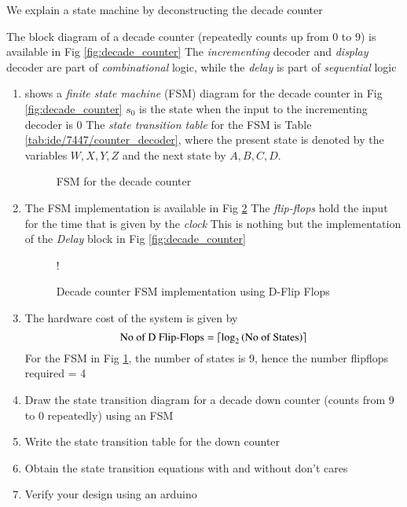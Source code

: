 We explain  a state machine by deconstructing the decade counter

The block diagram of a decade counter (repeatedly counts up from 0 to 9)
is available in Fig \ref{fig:decade_counter}  The {\em incrementing } decoder
and {\em display} decoder are part of {\em combinational} logic, while
the {\em delay} is part of {\em sequential} logic
%
%
\begin{enumerate}[label=\arabic*.,ref=\theenumi]
%
\item {} shows a {\em finite state machine} (FSM) diagram for the decade counter in Fig \ref{fig:decade_counter}  $s_0$ is the state when the input to the incrementing decoder is 0  The {\em state transition table} for the FSM is Table \ref{tab:ide/7447/counter_decoder},
		where the present state is denoted by the variables $W,X,Y,Z$ and the next state by $A,B,C,D$.  
\begin{figure}[!h]
\centering

\caption{FSM for the decade counter}
\label{fig:fsm_counter}
\end{figure}
\item The FSM implementation is available in Fig \ref{fig:dff}  The {\em flip-flops} hold the input for the time that is given by the {\em clock}  This is nothing but the implementation of the {\em Delay} block in Fig \ref{fig:decade_counter}
%
\begin{figure}[!h]
\resizebox {\columnwidth} {!} {

}
\caption{Decade counter FSM implementation using D-Flip Flops}
\label{fig:dff}
\end{figure}
%
\item The hardware cost of the system is given by
\begin{equation}
\text{No of D Flip-Flops} = \left \lceil \log_{2}\left(\text{No of States}\right) \right \rceil
\end{equation}
For the FSM in Fig \ref{fig:fsm_counter}, the number of states is 9, hence the number flipflops required = 4  
\item Draw the state transition diagram for 
a decade down counter (counts from 9 to 0 repeatedly) using an FSM  
\item Write the state transition table for the down counter
\item Obtain the state transition equations with and without don't cares
\item Verify your design using an arduino
\end{enumerate}


